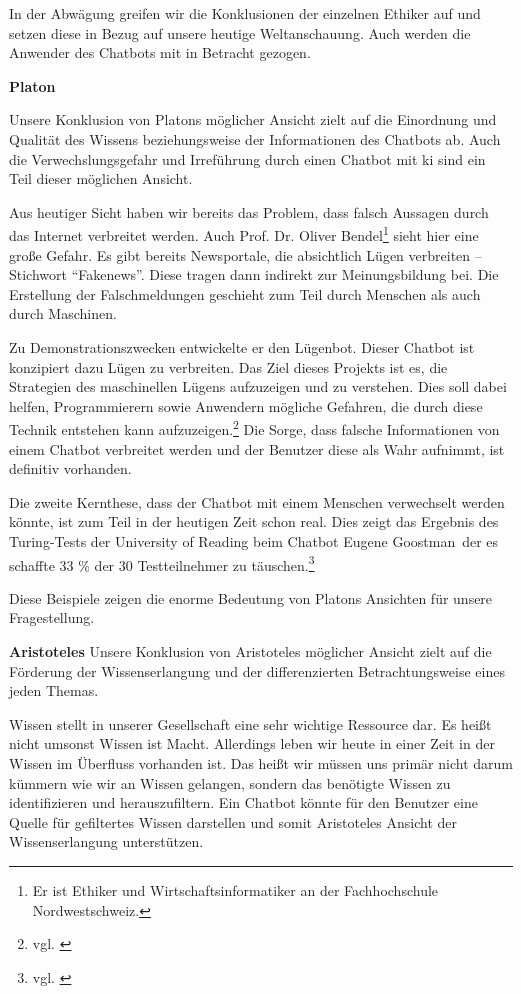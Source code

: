 In der Abwägung greifen wir die Konklusionen der einzelnen Ethiker auf und setzen diese in Bezug auf unsere heutige Weltanschauung. Auch werden die Anwender des Chatbots mit in Betracht gezogen.

\textbf{Platon}

Unsere Konklusion von Platons möglicher Ansicht zielt auf die Einordnung und Qualität des Wissens beziehungsweise der Informationen des Chatbots ab. Auch die Verwechslungsgefahr und Irreführung durch einen Chatbot mit \ac{ki} sind ein Teil dieser möglichen Ansicht.

Aus heutiger Sicht haben wir bereits das Problem, dass falsch Aussagen durch das Internet verbreitet werden. Auch Prof. Dr. Oliver Bendel\footnote{Er ist Ethiker und Wirtschaftsinformatiker an der Fachhochschule Nordwestschweiz.} sieht hier eine große Gefahr. 
Es gibt bereits Newsportale, die absichtlich Lügen verbreiten -- Stichwort \enquote{Fakenews}. 
Diese tragen dann indirekt zur Meinungsbildung bei. 
Die Erstellung der Falschmeldungen geschieht zum Teil durch Menschen als auch durch Maschinen. 

Zu Demonstrationszwecken entwickelte er den Lügenbot. Dieser Chatbot ist konzipiert dazu Lügen zu verbreiten. 
Das Ziel dieses Projekts ist es, die Strategien des maschinellen Lügens aufzuzeigen und zu verstehen. 
Dies soll dabei helfen, Programmierern sowie Anwendern mögliche Gefahren, die durch diese Technik entstehen kann aufzuzeigen.\footnote{vgl. \cite{Bendel}}  Die Sorge, dass falsche Informationen von einem Chatbot verbreitet werden und der Benutzer diese als Wahr aufnimmt, ist definitiv vorhanden.

Die zweite Kernthese, dass der Chatbot mit einem Menschen verwechselt werden könnte, ist zum Teil in der heutigen Zeit schon real.
Dies zeigt das Ergebnis des Turing-Tests der University of Reading beim Chatbot \glqq Eugene Goostman\grqq\, der es schaffte 33 \% der 30 Testteilnehmer zu täuschen.\footnote{vgl. \cite{UnivOfReading}} 

Diese Beispiele zeigen die enorme Bedeutung von Platons Ansichten für unsere Fragestellung. 

\textbf{Aristoteles}
Unsere Konklusion von Aristoteles möglicher Ansicht zielt auf die Förderung der Wissenserlangung und der differenzierten Betrachtungsweise eines jeden Themas.

Wissen stellt in unserer Gesellschaft eine sehr wichtige Ressource dar. Es heißt nicht umsonst \glqq Wissen ist Macht\grqq. Allerdings leben wir heute in einer Zeit in der Wissen im Überfluss vorhanden ist. Das heißt wir müssen uns primär nicht darum kümmern wie wir an Wissen gelangen, sondern das benötigte Wissen zu identifizieren und herauszufiltern.
Ein Chatbot könnte für den Benutzer eine Quelle für gefiltertes Wissen darstellen und somit Aristoteles Ansicht der Wissenserlangung unterstützen.

